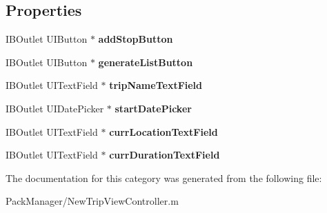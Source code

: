 \subsection*{Properties}
\begin{DoxyCompactItemize}
\item 
\hypertarget{category_new_trip_view_controller_07_08_a4de5831400f9c1599152b534ca83a801}{I\-B\-Outlet U\-I\-Button $\ast$ {\bfseries add\-Stop\-Button}}\label{category_new_trip_view_controller_07_08_a4de5831400f9c1599152b534ca83a801}

\item 
\hypertarget{category_new_trip_view_controller_07_08_abbce0a1b0d8abce963ced44be5f6cd33}{I\-B\-Outlet U\-I\-Button $\ast$ {\bfseries generate\-List\-Button}}\label{category_new_trip_view_controller_07_08_abbce0a1b0d8abce963ced44be5f6cd33}

\item 
\hypertarget{category_new_trip_view_controller_07_08_a21eb151ed2a52e4bcf751cd72f57233c}{I\-B\-Outlet U\-I\-Text\-Field $\ast$ {\bfseries trip\-Name\-Text\-Field}}\label{category_new_trip_view_controller_07_08_a21eb151ed2a52e4bcf751cd72f57233c}

\item 
\hypertarget{category_new_trip_view_controller_07_08_ac36b7787abef9c7a1fe648c471a8a8ee}{I\-B\-Outlet U\-I\-Date\-Picker $\ast$ {\bfseries start\-Date\-Picker}}\label{category_new_trip_view_controller_07_08_ac36b7787abef9c7a1fe648c471a8a8ee}

\item 
\hypertarget{category_new_trip_view_controller_07_08_a9e87d61abcadfeaca563b76bfa4a78fa}{I\-B\-Outlet U\-I\-Text\-Field $\ast$ {\bfseries curr\-Location\-Text\-Field}}\label{category_new_trip_view_controller_07_08_a9e87d61abcadfeaca563b76bfa4a78fa}

\item 
\hypertarget{category_new_trip_view_controller_07_08_a4149be533fd16b7d618aeb07eff1821c}{I\-B\-Outlet U\-I\-Text\-Field $\ast$ {\bfseries curr\-Duration\-Text\-Field}}\label{category_new_trip_view_controller_07_08_a4149be533fd16b7d618aeb07eff1821c}

\end{DoxyCompactItemize}


The documentation for this category was generated from the following file\-:\begin{DoxyCompactItemize}
\item 
Pack\-Manager/New\-Trip\-View\-Controller.\-m\end{DoxyCompactItemize}
